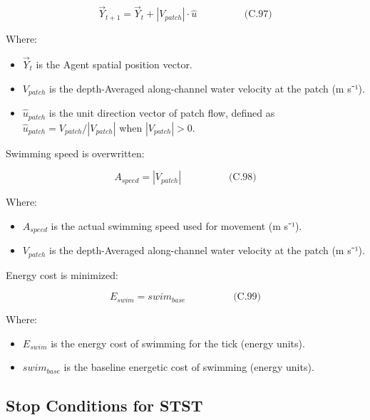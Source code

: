 \documentclass[
]{book}
\providecommand{\tightlist}{%
  \setlength{\itemsep}{0pt}\setlength{\parskip}{0pt}}
\begin{document}
\[
\begin{equation} \vec{Y}_{t+1} = \vec{Y}_t + |V_{patch}| \cdot \hat{u}  \hspace{2cm} \text{(C.97)} \end{equation}
\]

Where:

\begin{itemize}
\tightlist
\item
  \(\vec{Y}_t\) is the Agent spatial position vector.
\item
  \(V_{patch}\) is the depth-Averaged along-channel water velocity at
  the patch (m s⁻¹).
\item
  \(\hat{u}_{patch}\) is the unit direction vector of patch flow,
  defined as \(\hat{u}_{patch} = V_{patch} / |V_{patch}|\) when
  \(|V_{patch}| > 0\).
\end{itemize}

Swimming speed is overwritten:

\[
\begin{equation} A_{speed} = |V_{patch}|  \hspace{2cm} \text{(C.98)} \end{equation}
\]

Where:

\begin{itemize}
\tightlist
\item
  \(A_{speed}\) is the actual swimming speed used for movement (m s⁻¹).
\item
  \(V_{patch}\) is the depth-Averaged along-channel water velocity at
  the patch (m s⁻¹).
\end{itemize}

Energy cost is minimized:

\[
\begin{equation} E_{swim} = swim_{base}  \hspace{2cm} \text{(C.99)} \end{equation}
\]

Where:

\begin{itemize}
\tightlist
\item
  \(E_{swim}\) is the energy cost of swimming for the tick (energy
  units).
\item
  \(swim_{base}\) is the baseline energetic cost of swimming (energy
  units).
\end{itemize}

\subsection{Stop Conditions for STST}\label{stop-conditions-for-stst}
\end{document}
